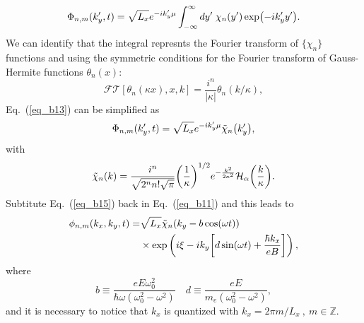 \begin{equation} \label{eq_b13}
  \Phi_{n,m}({k'_y} ,t) =
  {\sqrt{L_x}} e^{-i {k'_y}\mu}
  \int_{-\infty}^{\infty} dy'\;
  \chi_{n}\qty(y')
  \exp(-i{k'_y} y').
\end{equation}
We can identify that the integral represnts the Fourier transform of $\{\chi_n\}$ functions and using the symmetric conditions \cite{celeghini21} for the Fourier transform of Gauss-Hermite functions $\theta_n(x)$:
\begin{equation} \label{eq_b14}
  \mathcal{FT}[\theta_n(\kappa x),x,k] = \frac{i^n}{|\kappa|}\theta_n(k/\kappa),
\end{equation}
Eq.~(\ref{eq_b13}) can be simplified as
\begin{equation} \label{eq_b15}
  \Phi_{n,m}({k'_y} ,t) =
    \sqrt{L_x}e^{-i {k'_y}\mu}
    \tilde{\chi}_{n}\qty({k'_y}),
\end{equation}
with
\begin{equation} \label{eq_b16}
  \tilde{\chi}_{n}\qty(k) =
  \frac{i^n}{\sqrt{2^{n} n! \sqrt{\pi}}}
  \qty(\frac{1}{\kappa})^{1/2}
  e^{-\frac{k^2}{2 \kappa^2}}
  \mathcal{H}_{\alpha} \qty(\frac{k}{\kappa}).
\end{equation}
Subtitute Eq.~(\ref{eq_b15}) back in Eq.~(\ref{eq_b11}) and this leads to
\begin{equation} \label{eq_b17}
  \begin{aligned}
    \phi_{n,m}(k_x,k_y,t)  = &
    {\sqrt{L_x}}
    \tilde{\chi}_{n}\qty(k_y - b\cos(\omega t)) \\
    & \times
    \text{exp}\left(
      i\xi
      -ik_y  \qty[d\sin(\omega t) + \frac{\hbar k_x}{eB}]
    \right),
  \end{aligned}
\end{equation}
where
\begin{equation} \label{eq_b18}
  b \equiv
  \frac{eE\omega_0^2}{\hbar\omega(\omega_0^2 - \omega^2)} \quad
  d \equiv
 \frac{eE}{m_e(\omega_0^2 - \omega^2)},
\end{equation}
and it is necessary to notice that $k_x$ is quantized with $k_x = 2\pi m/L_x ~,~ m \in \mathbb{Z}$.
